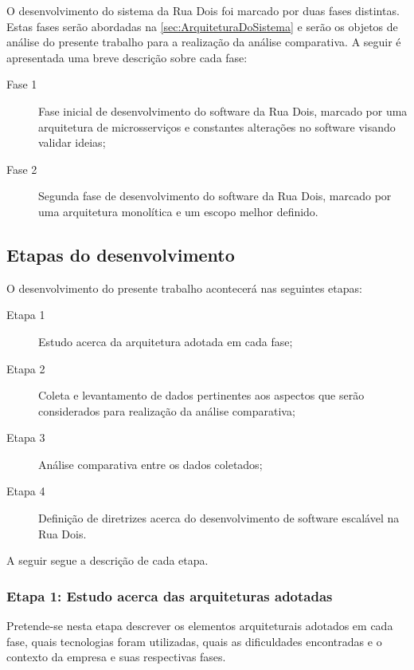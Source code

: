 O desenvolvimento do sistema da Rua Dois foi marcado por duas fases distintas.
Estas fases serão abordadas na \autoref{sec:ArquiteturaDoSistema} e serão
os objetos de análise do presente trabalho para a realização da análise
comparativa. A seguir é apresentada uma breve descrição sobre cada fase:

    \begin{description}
        \item [Fase 1] Fase inicial de desenvolvimento do software da Rua Dois,
        marcado por uma arquitetura de microsserviços e constantes alterações
        no software visando validar ideias;
        \item [Fase 2] Segunda fase de desenvolvimento do software da Rua Dois,
        marcado por uma arquitetura monolítica e um escopo melhor definido.
    \end{description}

\subsection{Etapas do desenvolvimento}
\label{sec:EtapasDoDesenvolvimento}

O desenvolvimento do presente trabalho acontecerá nas seguintes etapas:

    \begin{description}
        \item[Etapa 1] Estudo acerca da arquitetura adotada em cada fase;
        \item[Etapa 2] Coleta e levantamento de dados pertinentes aos aspectos que serão
        considerados para realização da análise comparativa;
        \item[Etapa 3] Análise comparativa entre os dados coletados;
        \item[Etapa 4] Definição de diretrizes acerca do desenvolvimento de software
        escalável na Rua Dois.
    \end{description}

A seguir segue a descrição de cada etapa.

\subsubsection{Etapa 1: Estudo acerca das arquiteturas adotadas}

Pretende-se nesta etapa descrever os elementos arquiteturais adotados em cada fase,
quais tecnologias foram utilizadas, quais as dificuldades encontradas e o contexto
da empresa e suas respectivas fases.

